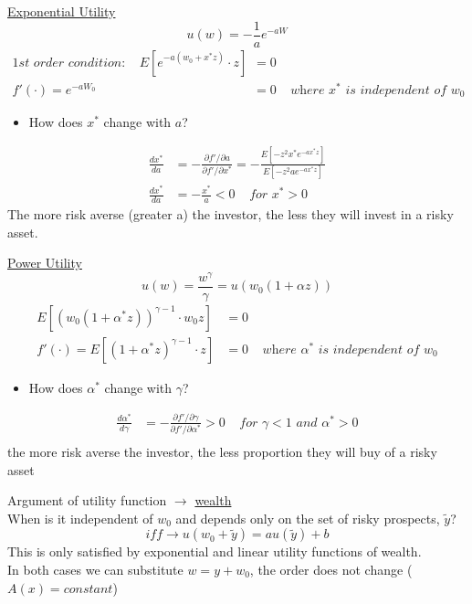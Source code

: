 \documentclass[
14pt,notheorems,hyperref={pdfauthor=whatever}
]{beamer}
\begin{document}
\begin{frame}
\underline{Exponential Utility}
\[u(w) = -\frac{1}{a}e^{-aW}\]
\begin{align*}
    \textit{1st order condition:}\;\;\;\; E[e^{-a(w_0+x^*z)} \cdot z] &= 0\\
    f'(\cdot) = e^{-aW_0} &= 0\;\;\;\;\textit{where $x^*$ is independent of $w_0$}
\end{align*}
\begin{itemize}
    \item How does $x^*$ change with $a$?\\
\end{itemize}
\begin{align*}
    \frac{dx^*}{da} &= -\frac{\partial f'/\partial a}{\partial f'/\partial x^*} = -\frac{E[-z^2 x^*e^{-ax^*z}]}{E[-z^2 ae^{-ax^*z}]}\\
    \frac{dx^*}{da} &= -\frac{x^*}{a}<0 \;\;\;\; \textit{for $x^*>0$}
\end{align*}
The more risk averse (greater a) the investor, the less they will invest in a risky asset.
\end{frame}

\begin{frame}
\underline{Power Utility}
\[u(w) = \frac{w^\gamma}{\gamma} = u(w_0(1+\alpha z))\]
\begin{align*}
    E[(w_0(1+\alpha^*z))^{\gamma-1}\cdot w_0z] &= 0\\
    f'(\cdot) = E[(1+\alpha^*z)^{\gamma-1}\cdot z] &= 0\;\;\;\;\textit{where $\alpha^*$ is independent of $w_0$}
\end{align*}
\begin{itemize}
    \item How does $\alpha^*$ change with $\gamma$?\\
\end{itemize}
\begin{align*}
    \frac{d\alpha^*}{d\gamma} &= -\frac{\partial f'/\partial \gamma}{\partial f'/\partial \alpha^*} >0 \;\;\;\; \textit{for $\gamma<1$ and $\alpha^*>0$}\\
\end{align*}
the more risk averse the investor, the less proportion they will buy of a risky asset
\end{frame}

\begin{frame}
Argument of utility function $\rightarrow$ \underline{wealth}\\
\hfill \break
When is it independent of $w_0$ and depends only on the set of risky prospects, $\tilde y$?\\
\[iff\rightarrow u(w_0+\tilde y) = a u(\tilde y) + b\]
This is only satisfied by exponential and linear utility functions of wealth.\\
\hfill \break
In both cases we can substitute $w = y+w_0$, the order does not change ($A(x) = constant$)
\end{frame}
\end{document}
